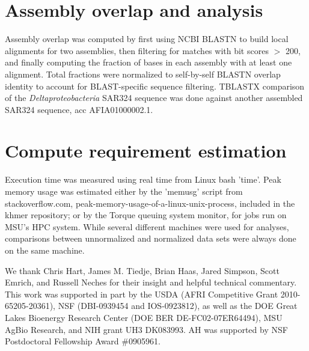 \documentclass{pnastwo}
\begin{document}
\begin{article}
\begin{materials}
\section{Assembly overlap and analysis}

Assembly overlap was computed by first using NCBI BLASTN to build local
alignments for two assemblies, then filtering for matches with bit scores
$>$ 200, and finally computing the fraction of bases in each assembly
with at least one alignment.  Total fractions were normalized to
self-by-self BLASTN overlap identity to account for BLAST-specific
sequence filtering.
TBLASTX comparison of the {\em Deltaproteobacteria} SAR324 sequence
was done against another assembled SAR324 sequence, acc AFIA01000002.1.

\section{Compute requirement estimation}

Execution time was measured using real time from Linux bash 'time'.
Peak memory usage was estimated either by the 'memusg' script from
stackoverflow.com, peak-memory-usage-of-a-linux-unix-process, included
in the khmer repository; or by the Torque queuing system monitor, for
jobs run on MSU's HPC system.  While several different machines were
used for analyses, comparisons between unnormalized and normalized
data sets were always done on the same machine.

\end{materials}

\begin{acknowledgments}

We thank Chris Hart, James M. Tiedje, Brian Haas, Jared Simpson, Scott
Emrich, and Russell Neches for their insight and helpful technical
commentary.  This work was supported in part by the USDA (AFRI
Competitive Grant 2010-65205-20361), NSF (DBI-0939454 and
IOS-0923812), as well as the DOE Great Lakes Bioenergy Research Center
(DOE BER DE-FC02-07ER64494), MSU AgBio Research, and NIH grant UH3
DK083993.  AH was supported by NSF Postdoctoral Fellowship Award
\#0905961.

\end{acknowledgments}

%
%

\begin{thebibliography}{20}


\end{thebibliography}
\end{article}
\end{document}
